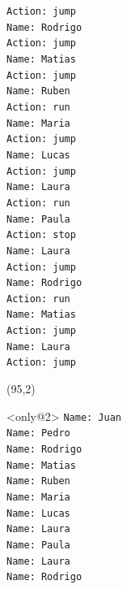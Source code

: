 \documentclass{beamer}
\begin{document}
\begin{frame}[fragile,t]
\begin{textblock}{25}
\begin{block}
    \verb;Action: jump;\\
    \verb;Name: Rodrigo;\\
    \verb;Action: jump;\\
    \verb;Name: Matias;\\
    \verb;Action: jump;\\
    \verb;Name: Ruben;\\
    \verb;Action: run;\\
    \verb;Name: Maria;\\
    \verb;Action: jump;\\
    \verb;Name: Lucas;\\
    \verb;Action: jump;\\
    \verb;Name: Laura;\\
    \verb;Action: run;\\
    \verb;Name: Paula;\\
    \verb;Action: stop;\\
    \verb;Name: Laura;\\
    \verb;Action: jump;\\
    \verb;Name: Rodrigo;\\
    \verb;Action: run;\\
    \verb;Name: Matias;\\
    \verb;Action: jump;\\
    \verb;Name: Laura;\\
    \verb;Action: jump;\\
    \vspace*{0.5ex}
    \end{block}
    \end{textblock}
    \begin{textblock}{25}(95,2)
    \begin{block}<only@2>{\vspace*{-3ex}}
    \scriptsize
    \verb;Name: Juan;\\
    \verb;Name: Pedro;\\
    \verb;Name: Rodrigo;\\
    \verb;Name: Matias;\\
    \verb;Name: Ruben;\\
    \verb;Name: Maria;\\
    \verb;Name: Lucas;\\
    \verb;Name: Laura;\\
    \verb;Name: Paula;\\
    \verb;Name: Laura;\\
    \verb;Name: Rodrigo;\\

\end{block}
\end{textblock}
\end{frame}
\end{document}
